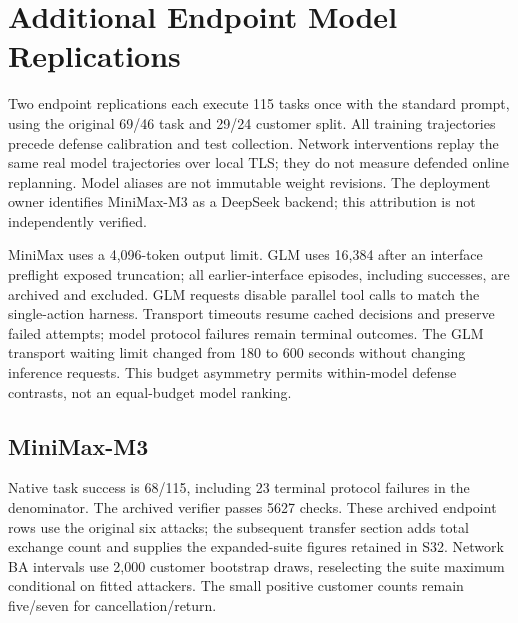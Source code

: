 \section{Additional Endpoint Model Replications}\label{sec:endpoint-replication}

Two endpoint replications each execute 115 tasks once with the standard prompt, using the original 69/46 task and 29/24 customer split. All training trajectories precede defense calibration and test collection. Network interventions replay the same real model trajectories over local TLS; they do not measure defended online replanning. Model aliases are not immutable weight revisions. The deployment owner identifies MiniMax-M3 as a DeepSeek backend; this attribution is not independently verified.

MiniMax uses a 4,096-token output limit. GLM uses 16,384 after an interface preflight exposed truncation; all earlier-interface episodes, including successes, are archived and excluded. GLM requests disable parallel tool calls to match the single-action harness. Transport timeouts resume cached decisions and preserve failed attempts; model protocol failures remain terminal outcomes. The GLM transport waiting limit changed from 180 to 600 seconds without changing inference requests. This budget asymmetry permits within-model defense contrasts, not an equal-budget model ranking.

\subsection{MiniMax-M3}

Native task success is 68/115, including 23 terminal protocol failures in the denominator. The archived verifier passes 5627 checks. These archived endpoint rows use the original six attacks; the subsequent transfer section adds total exchange count and supplies the expanded-suite figures retained in S32. Network BA intervals use 2,000 customer bootstrap draws, reselecting the suite maximum conditional on fitted attackers. The small positive customer counts remain five/seven for cancellation/return.

